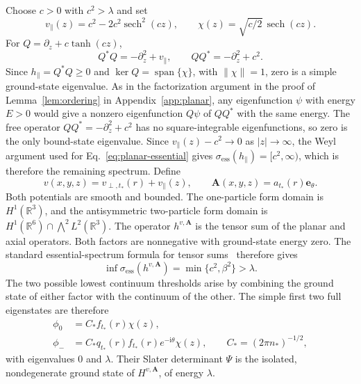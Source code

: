 \documentclass[11pt,a4paper]{article}
\theoremstyle{remark}
\theoremstyle{plain}
\newcommand{\R}{\mathbb R}
\newcommand{\A}{\mathbf A}
\newcommand{\ee}{\mathbf e_\theta}
\begin{document}
Choose $c>0$ with $c^2>\lambda$ and set
\begin{equation}
 v_\parallel(z)=c^2-2c^2\operatorname{sech}^2(cz),\qquad
 \chi(z)=\sqrt{c/2}\,\operatorname{sech}(cz).
 \label{eq:axial}
\end{equation}
For $Q=\partial_z+c\tanh(cz)$,
\begin{equation*}
 Q^*Q=-\partial_z^2+v_\parallel,\qquad
 QQ^*=-\partial_z^2+c^2.
\end{equation*}
Since $h_\parallel=Q^*Q\ge0$ and $\ker Q=\operatorname{span}\{\chi\}$,
with $\|\chi\|=1$, zero is a simple ground-state eigenvalue.
As in the factorization argument in the proof of
Lemma~\ref{lem:ordering} in Appendix~\ref{app:planar}, any eigenfunction
$\psi$ with energy $E>0$ would give a nonzero eigenfunction $Q\psi$
of $QQ^*$ with the same energy. The free operator
$QQ^*=-\partial_z^2+c^2$ has no square-integrable eigenfunctions,
so zero is the only bound-state eigenvalue. Since
$v_\parallel(z)-c^2\to0$ as $|z|\to\infty$, the Weyl argument used
for Eq.~\eqref{eq:planar-essential} gives
$\sigma_{\mathrm{ess}}(h_\parallel)=[c^2,\infty)$, which is therefore
the remaining spectrum. Define
\begin{equation}
 v(x,y,z)=v_{\perp,t_*}(r)+v_\parallel(z),\qquad
 \A(x,y,z)=a_{t_*}(r)\ee.
 \label{eq:bounded-potentials}
\end{equation}
Both potentials are smooth and bounded. The one-particle form domain
is $H^1(\R^3)$, and the antisymmetric two-particle form domain is
$H^1(\R^6)\cap\bigwedge^2L^2(\R^3)$.
The operator $h^{v,\A}$ is the tensor sum of the planar and axial
operators. Both factors are nonnegative with ground-state energy zero.
The standard essential-spectrum formula for tensor
sums~\cite[Theorem~4.1(a)]{Ichinose1978} therefore gives
\begin{equation*}
 \inf\sigma_{\mathrm{ess}}(h^{v,\A})
 =\min\{c^2,\beta^2\}>\lambda.
\end{equation*}
The two possible lowest continuum thresholds arise by combining the
ground state of either factor with the continuum of the other.
The simple first two full eigenstates are therefore
\begin{align*}
 \phi_0&=C_*f_{t_*}(r)\chi(z),\\
 \phi_-&=C_*q_{t_*}(r)f_{t_*}(r)e^{-\mathrm{i}\theta}\chi(z),
 \qquad C_*=(2\pi n_*)^{-1/2},
\end{align*}
with eigenvalues $0$ and $\lambda$. Their Slater determinant $\Psi$
is the isolated, nondegenerate ground state of $H^{v,\A}$, of
energy $\lambda$.
\end{document}
